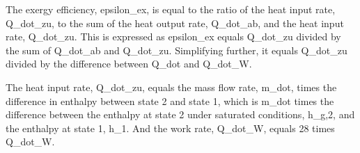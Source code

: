The exergy efficiency, epsilon_ex, is equal to the ratio of the heat input rate, Q_dot_zu, to the sum of the heat output rate, Q_dot_ab, and the heat input rate, Q_dot_zu. This is expressed as epsilon_ex equals Q_dot_zu divided by the sum of Q_dot_ab and Q_dot_zu. Simplifying further, it equals Q_dot_zu divided by the difference between Q_dot and Q_dot_W.

The heat input rate, Q_dot_zu, equals the mass flow rate, m_dot, times the difference in enthalpy between state 2 and state 1, which is m_dot times the difference between the enthalpy at state 2 under saturated conditions, h_g,2, and the enthalpy at state 1, h_1. And the work rate, Q_dot_W, equals 28 times Q_dot_W.